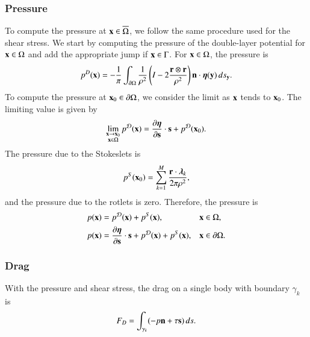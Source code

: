 \documentclass[preprint, 10pt]{elsarticle}
\begin{document}
\subsubsection{Pressure}
To compute the pressure at ${\mathbf{x}} \in \overline{\Omega}$, we follow the
same procedure used for the shear stress.  We start by computing the
pressure of the double-layer potential for ${\mathbf{x}} \in \Omega$ and add the
appropriate jump if ${\mathbf{x}} \in \Gamma$. For ${\mathbf{x}} \in \Omega$, the pressure
is
\begin{align}
  p^{D}({\mathbf{x}}) = -\frac{1}{\pi}\int_{{\partial}\Omega} \frac{1}{\rho^2}
    \left(I - 2 \frac{{\mathbf{r}} \otimes {\mathbf{r}}}{\rho^2}\right) 
    {\mathbf{n}} \cdot {\boldsymbol\eta}({\mathbf{y}}) \,ds_{\mathbf{y}}.
    \label{eqn:pressureDLP}
\end{align}
To compute the pressure at ${\mathbf{x}}_0 \in {\partial}\Omega$, we consider the limit
as ${\mathbf{x}}$ tends to ${\mathbf{x}}_0$.  The limiting value is given
by~\cite{qua-bir2014a}
\begin{align}
  \lim_{\substack{{\mathbf{x}} \rightarrow {\mathbf{x}}_0 \\ {\mathbf{x}} \in \Omega}}p^{\mathcal{D}}({\mathbf{x}}) =  
    \frac{\partial {\boldsymbol\eta}}{\partial {\mathbf{s}}} \cdot {\mathbf{s}} + p^{{\mathcal{D}}}({\mathbf{x}}_0).
  \label{eqn:pressureJump}
\end{align}
The pressure due to the Stokeslets is
\begin{align}
  p^S({\mathbf{x}}_0) = \sum_{k=1}^{M}\frac{{\mathbf{r}} \cdot {\boldsymbol\lambda}_k}{2\pi\rho^2},
  \label{eqn:shearPressureSR}
\end{align}
and the pressure due to the rotlets is zero.  Therefore, the pressure is
\begin{align*}
  p({\mathbf{x}}) &= p^{{\mathcal{D}}}({\mathbf{x}}) + p^{S}({\mathbf{x}}), \quad &&{\mathbf{x}} \in \Omega,\\
  p({\mathbf{x}}) &= \frac{\partial {\boldsymbol\eta}}{\partial {\mathbf{s}}} \cdot {\mathbf{s}} + p^{{\mathcal{D}}}({\mathbf{x}}) + 
              p^{S}({\mathbf{x}}), && {\mathbf{x}} \in {\partial}\Omega.
\end{align*}

\subsubsection{Drag}
With the pressure and shear stress, the drag on a single body with
boundary $\gamma_k$ is
\begin{align}
  F_D = \int_{\gamma_k} (-p {\mathbf{n}} + \tau {\mathbf{s}})\,ds.
  \label{eqn:drag}
\end{align}
\end{document}
